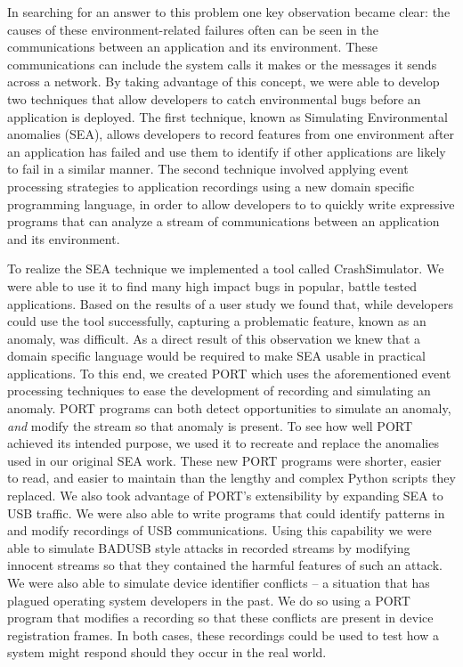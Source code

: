 In searching for an answer to this problem one key observation became clear:
the causes of these environment-related failures
often can be seen in the
communications between an application and its environment. These communications can include the
system calls it makes or the messages it sends across a network.
By taking advantage of this concept,
we were able to develop two techniques that allow developers to catch environmental bugs
before an application is deployed. 
The first technique,
known as Simulating Environmental anomalies (SEA),
allows developers to record features from one environment
after an application has failed and use them to identify if other
applications are likely to fail in a similar manner.
The second technique involved 
applying event processing strategies
to application recordings
using a new  domain specific programming language,
in order to allow developers to
to quickly write expressive programs that can analyze a stream of communications between an application and  its environment.

To realize the SEA technique we implemented a tool called CrashSimulator.
We were able to use it to find many high impact bugs in popular,
battle tested applications.
Based on the results of a user study we found that,
while developers could use the tool successfully,
capturing a problematic feature, known as an anomaly, was difficult.
As a direct result of this observation we knew that a domain specific language would be required to make SEA usable in practical applications.
 To this end, we created PORT
which uses the aforementioned event processing techniques
to ease the development of recording and simulating an anomaly.
PORT programs can both detect opportunities to
simulate an anomaly, \textit{and} modify the stream so that anomaly is present.
To see how well PORT achieved its intended purpose, we used it to recreate and
replace the anomalies used in our original SEA work.
These new PORT programs were shorter, easier to read, and easier to
maintain than the lengthy and complex Python scripts they replaced.
We also took advantage of PORT's extensibility by expanding SEA to USB
traffic.
We were also able to write programs that could identify patterns in and
modify recordings of USB communications.
Using this capability we were able to simulate
BADUSB style attacks in recorded streams by modifying innocent streams
so that they contained the harmful features of such an attack.
We were also able to simulate device identifier conflicts -- a situation that has
plagued operating system developers in the past.
We do so using a PORT program that modifies a recording so that these conflicts
are present in device registration frames.
In both cases, these recordings could be used
to test how a system might respond should they occur in the real world.

